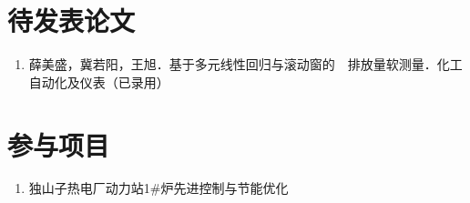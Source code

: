 ﻿\begin{publications}


\section*{待发表论文}

\begin{enumerate}
\item {薛美盛，冀若阳，王旭．基于多元线性回归与滚动窗的~~排放量软测量．化工自动化及仪表（已录用）}
\end{enumerate}

\section*{参与项目}
\begin{enumerate}
\item 独山子热电厂动力站1\#炉先进控制与节能优化
\end{enumerate}

\end{publications}
